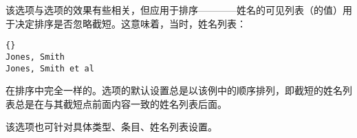 \begin{optionlist}
该选项与选项的效果有些相关，但应用于排序————姓名的可见列表（的值）用于决定排序是否忽略截短。这意味着，当时，姓名列表：

\begin{lstlisting}{}
Jones, Smith
Jones, Smith et al
\end{lstlisting}
%
在排序中完全一样的。选项的默认设置总是以该例中的顺序排列，即截短的姓名列表总是在与其截短点前面内容一致的姓名列表后面。

该选项也可针对具体类型、条目、姓名列表设置。

\end{optionlist}

